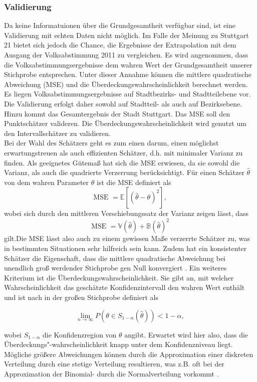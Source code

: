 \documentclass{Vorlage}
\begin{document}
\subsubsection{Validierung}
Da keine Informatuionen über die Grundgesamtheit verfügbar sind, ist eine Validierung mit echten Daten nicht möglich. Im Falle der Meinung zu Stuttgart 21 bietet sich jedoch die Chance, die Ergebnisse der Extrapolation mit dem Ausgang der Volksabstimmung 2011 \cite{Amt} zu vergleichen. Es wird angenommen, dass die Volksabstimmungsergebnisse dem wahren Wert der Grundgesamtheit unserer Stichprobe entsprechen. Unter dieser Annahme können die mittlere quadratische Abweichung (MSE) und die Überdeckungswahrscheinlichkeit berechnet werden. Es liegen Volksabstimmungsergebnisse auf Stadtbezirks- und Stadtteilebene vor. Die Validierung erfolgt daher sowohl auf Stadtteil- als auch auf Bezirksebene. Hinzu kommt das Gesamtergebnis der Stadt Stuttgart. Das MSE soll den Punktschätzer valideren. Die Überdeckungswahrscheinlichkeit wird genutzt um den Intervallschätzer zu validieren.\\
Bei der Wahl des Schätzers geht es zum einen darum, einen möglichst erwartungstreuen als auch effizienten Schätzer, d.h. mit minimaler Varianz zu finden. Als geeignetes Gütemaß hat sich die MSE erwiesen, da sie sowohl die Varianz, als 
auch die quadrierte Verzerrung berücksichtigt. Für einen Schätzer $\hat{\theta}$ von dem wahren Parameter $\theta$ ist die MSE definiert als
$$
\text{MSE } = \mathbb{E}[(\hat{\theta} - \theta)^2],
$$
wobei sich durch den mittleren Verschiebungssatz der Varianz zeigen lässt, dass
$$
\text{MSE } = \mathbb{V}(\hat{\theta}) + \mathbb{B}(\hat{\theta})^2
$$
gilt.Die MSE lässt also auch zu einem gewissen Maße verzerrte Schätzer zu, was in bestimmten Situationen sehr hilfreich sein kann. Zudem hat ein konsistenter Schätzer die Eigenschaft, dass die mittlere 
quadratische Abweichung bei unendlich groß werdender Stichprobe gen Null konvergiert \cite[p. 201]{HOG}. Ein weiteres 
Kriterium ist die Überdeckungswahrscheinlichkeit. Sie gibt an, mit welcher Wahrscheinlichkeit das geschätzte 
Konfidenzintervall den wahren Wert enthält und ist nach \cite{zhang} in der großen Stichprobe definiert als

$$
\lim\limits_{n \rightarrow \infty}{P(\theta \in S_{1-\alpha}(\hat{\theta})) < 1-\alpha},
$$

wobei $S_{1-\alpha}$ die Konfidenzregion von $\theta$ angibt. Erwartet wird hier also, dass die Überdeckungs"-wahrscheinlichkeit knapp unter dem
Konfidenzniveau liegt. Mögliche größere Abweichungen können durch die Approximation einer diskreten Verteilung 
durch eine stetige Verteilung resultieren, was z.B. oft bei der Approximation der Binomial- durch die Normalverteilung 
vorkommt \cite[p. 102]{Int}.
\end{document}
